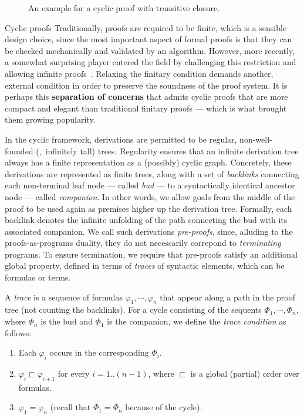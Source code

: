 \begin{figure}

\caption{An example for a cyclic proof with transitive closure.}
\label{b2:tc-cyclic-example}
\end{figure}

\begin{paragraph}{Cyclic proofs}
Traditionally, proofs are required to be finite, which is a sensible design choice, since the most important aspect of formal proofs is that they can be checked mechanically and validated by an algorithm.
However, more recently, a somewhat surprising player entered the field by challenging this restriction and allowing infinite proofs~\cite{LICS2007:Brotherston}.
Relaxing the finitary condition demands another, external condition in order to preserve the soundness of the proof system.
It is perhaps this \textbf{separation of concerns} that admits cyclic proofs that are more compact and elegant than traditional finitary proofs --- which is what brought them growing popularity.

In the cyclic framework, derivations are permitted to be regular,
non-well-founded (\ie,~infinitely tall) trees.
Regularity ensures that an infinite derivation tree always has a finite representation
as a (possibly) cyclic graph.
Concretely, these derivations are represented as finite trees, 
along with a set of \emph{backlinks} connecting each
non-terminal leaf node --- called \emph{bud} ---
to a syntactically identical ancestor node --- called \emph{companion}.
In other words, we allow goals from the middle of the proof to be
used again as premises higher up the derivation tree.
Formally, each backlink denotes the infinite unfolding of the
path connecting the bud with its associated companion.
We call such derivations \emph{pre-proofs}, since, alluding to the proofs-as-programs duality, they do not necessarily correpond to \emph{terminating} programs.
To ensure termination, we require that pre-proofs satisfy
an additional global property, defined in terms of \emph{traces} of syntactic elements, which can be formulas or terms.

A \emph{trace} is a sequence of formulas $\varphi_1, {\cdots}, \varphi_n$ that appear along a path in the proof tree (not counting the backlinks).
For a cycle consisting of the sequents $\Phi_1,{\cdots},\Phi_n$, where $\Phi_n$ is the bud and $\Phi_1$ is the companion, we define the \emph{trace condition} as follows:
\begin{enumerate}
 \item Each $\varphi_i$ occurs in the corresponding $\Phi_i$.
 \item $\varphi_i \sqsubset \varphi_{i+1}$ for every $i=1..(n-1)$, where $\sqsubset$ is a global (partial) order over formulas.
 \item $\varphi_1 = \varphi_n$ (recall that $\Phi_1 = \Phi_n$ because of the cycle).
\end{enumerate}
\end{paragraph}


